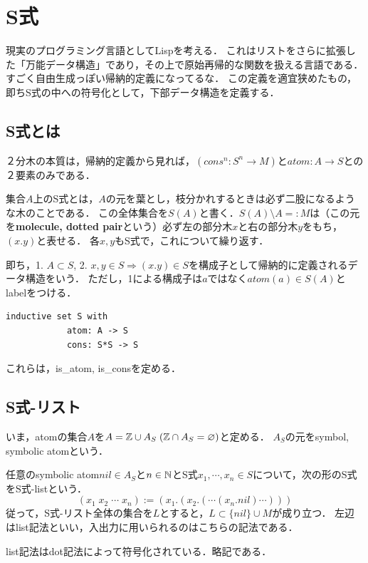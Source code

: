 \documentclass[uplatex, dvipdfmx]{jsreport}
\begin{document}
\section{S式}

現実のプログラミング言語としてLispを考える．
これはリストをさらに拡張した「万能データ構造」であり，その上で原始再帰的な関数を扱える言語である．
すごく自由生成っぽい帰納的定義になってるな．
この定義を適宜狭めたもの，即ちS式の中への符号化として，下部データ構造を定義する．

\subsection{S式とは}

２分木の本質は，帰納的定義から見れば，$(cons^n:S^n\to M)$と$atom:A\to S$との２要素のみである．

\begin{definition}
    集合$A$上のS式とは，$A$の元を葉とし，枝分かれするときは必ず二股になるような木のことである．
    この全体集合を$S(A)$と書く．$S(A)\setminus A=:M$は（この元を\textbf{molecule, dotted pair}という）必ず左の部分木$x$と右の部分木$y$をもち，$(x.y)$と表せる．
    各$x,y$もS式で，これについて繰り返す．
\end{definition}
\begin{remark}
    即ち，1. $A\subset S$, 2. $x,y\in S\Rightarrow (x.y)\in S$を構成子として帰納的に定義されるデータ構造をいう．
    ただし，1による構成子は$a$ではなく$atom(a)\in S(A)$とlabelをつける．
    \begin{lstlisting}[caption=inductive definition of S-formula]
        inductive set S with
            atom: A -> S
            cons: S*S -> S
    \end{lstlisting}
    これらは，is\_atom, is\_consを定める．
\end{remark}

\subsection{S式-リスト}

\begin{definition}
    いま，atomの集合$A$を$A=\mathbb{Z}\cup A_S\;(\mathbb{Z}\cap A_S=\varnothing)$と定める．
    $A_S$の元をsymbol, symbolic atomという．
\end{definition}

\begin{definition}[list]
    任意のsymbolic atom$nil\in A_S$と$n\in\mathbb{N}$とS式$x_1,\cdots,x_n\in S$について，次の形のS式をS式-listという．
    \[ (x_1\;x_2\;\cdots\;x_n) := (x_1.(x_2.(\cdots(x_n.nil)\cdots))) \]
    従って，S式-リスト全体の集合を$L$とすると，$L\subset\{nil\}\cup M$が成り立つ．
    左辺はlist記法といい，入出力に用いられるのはこちらの記法である．
\end{definition}
\begin{remark}
    list記法はdot記法によって符号化されている．略記である．
\end{remark}
\end{document}
